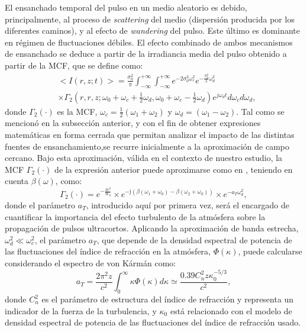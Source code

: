 El ensanchado temporal del pulso en un medio aleatorio es debido, principalmente, al proceso de \textit{scattering} del medio (dispersión producida por los diferentes caminos), y al efecto de \textit{wandering} del pulso. Este último es dominante en régimen de fluctuaciones débiles. El efecto combinado de ambos mecanismos de ensanchado se deduce a partir de la irradiancia media del pulso obtenido a partir de la MCF, que se define como:
\begin{equation}
\begin{split}
&<I(r,z;t)>=\frac{\sigma_{0}^{2}}{\pi}\int_{-\infty}^{+\infty}\int_{-\infty}^{+\infty}e^{-2\sigma_{0}^{2}\omega_{c}^{2}}e^{-\frac{\sigma_{0}^{2}}{2}\omega_{d}^{2}}\\
&\times\Gamma_{2}\left(r,r,z;\omega_{0}+\omega_{c}+\frac{1}{2}\omega_{d},\omega_{0}+\omega_{c}-\frac{1}{2}\omega_{d}\right)e^{j\omega_{d}t}d\omega_{c}d\omega_{d},
\end{split}
\end{equation}
donde $\Gamma_2(\cdot)$ es la MCF, $\omega_{c}=\frac{1}{2}\left(\omega_{1}+\omega_{2}\right)$ y $\omega_{d}=\left(\omega_{1}-\omega_{2}\right)$. Tal como se mencionó en la subsección anterior, y con el fin de obtener expresiones matemáticas en forma cerrada que permitan analizar el impacto de las distintas fuentes de ensanchamiento,se recurre inicialmente a la aproximación de campo cercano. Bajo esta aproximación, válida en el contexto de nuestro estudio, la MCF $\Gamma_2(\cdot)$ de la expresión anterior puede aproximarse como en \cite{Andrews}, teniendo en cuenta $\beta(\omega)$, como:
\begin{equation}
\Gamma_2(\cdot)=e^{-\frac{2r^{2}}{W_{0}}}\times e^{-\mathrm{j}\left(\beta(\omega_{1}+\omega_{0})-\beta(\omega_{2}+\omega_{0})\right)}\times e^{-a_{T}\omega_{d}^{2}},
\end{equation}
donde el parámetro $a_{T}$, introducido aquí por primera vez, será el encargado de cuantificar la importancia del efecto turbulento de la atmósfera sobre la propagación de pulsos ultracortos. Aplicando la aproximación de banda estrecha, $\omega_{d}^{2}\ll\omega_{c}^{2}$, el parámetro $a_{T}$, que depende de la densidad espectral de potencia de las fluctuaciones del índice de refracción en la atmósfera, $\Phi(\kappa)$, puede calcularse considerando el espectro de von Kármán como:
\begin{equation}
a_{T}=\frac{2\pi^{2}z}{c^{2}}\int_{0}^{\infty}\kappa\Phi(\kappa)d\kappa\simeq\frac{0.39C_{n}^{2}z\kappa_{0}^{-5/3}}{c^{2}},
\end{equation}
donde $C_{n}^{2}$ es el parámetro de estructura del índice de refracción y representa un indicador de la fuerza de la turbulencia, y $\kappa_{0}$ está relacionado con el modelo de densidad espectral de potencia de las fluctuaciones del índice de refracción usado.

